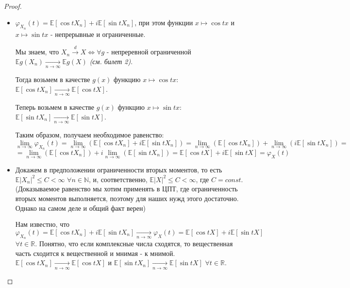 \begin{proof}
    \text{}
    \renewcommand{\labelitemi}{$\boldsymbol{\Rightarrow}$}
    \begin{itemize}
        \item \text{}
        
        $\varphi_{X_n}(t) = \mathbb{E}[\cos{tX_n}] + i\mathbb{E}[\sin{tX_n}]$, при этом функции $x \mapsto \cos{tx}$ и $x \mapsto \sin{tx}$ - непрерывные и ограниченные.
        
        Мы знаем, что $X_n \xrightarrow{d} X \Leftrightarrow \forall g$ - непреревной ограниченной $\mathbb{E}g(X_n) \xrightarrow[n \rightarrow \infty]{} \mathbb{E}g(X)$ \textit{(см. билет 2)}.
        
        Тогда возьмем в качестве $g(x)$ функцию $x \mapsto \cos{tx}$: $\mathbb{E}[\cos{tX_n}] \xrightarrow[n \rightarrow \infty]{} \mathbb{E}[\cos{tX}]$.
        
        Теперь возьмем в качестве $g(x)$ функцию $x \mapsto \sin{tx}$: $\mathbb{E}[\sin{tX_n}] \xrightarrow[n \rightarrow \infty]{} \mathbb{E}[\sin{tX}]$.
        
        Таким образом, получаем необходимое равенство: $$ \lim_{n \to \infty} \varphi_{X_n}(t) = \lim_{n \to \infty} (\mathbb{E}[\cos{tX_n}] + i\mathbb{E}[\sin{tX_n}]) = \lim_{n \to \infty} (\mathbb{E}[\cos{tX_n}]) + \lim_{n \to \infty} (i\mathbb{E}[\sin{tX_n}]) = $$ $$ = \lim_{n \to \infty} (\mathbb{E}[\cos{tX_n}]) + i\lim_{n \to \infty} (\mathbb{E}[\sin{tX_n}]) = \mathbb{E}[\cos{tX}] + i\mathbb{E}[\sin{tX}] = \varphi_{X}(t) $$
    \end{itemize}
    
    \renewcommand{\labelitemi}{$\boldsymbol{\Leftarrow}$}
    \begin{itemize}
        \item \text{}
        
        Докажем в предположении ограниченности вторых моментов, то есть $\mathbb{E}|X_n|^2 \leq C < \infty$ $\forall n \in \mathbb{N}$, и, соответственно, $\mathbb{E}|X|^2 \leq C < \infty$, где $C = const$. (Доказываемое равенство мы хотим применять в ЦПТ, где ограниченность вторых моментов выполняется, поэтому для наших нужд этого достаточно. Однако на самом деле и общий факт верен)
        
        Нам известно, что $\varphi_{X_n}(t) = \mathbb{E}[\cos{tX_n}] + i\mathbb{E}[\sin{tX_n}] \xrightarrow[n \rightarrow \infty]{} \varphi_{X}(t) = \mathbb{E}[\cos{tX}] + i\mathbb{E}[\sin{tX}]$ $\forall t \in \mathbb{R}$. Понятно, что если комплексные числа сходятся, то вещественная часть сходится к вещественной и мнимая - к мнимой. $\mathbb{E}[\cos{tX_n}] \xrightarrow[n \rightarrow \infty]{} \mathbb{E}[\cos{tX}]$ и $ \mathbb{E}[\sin{tX_n}] \xrightarrow[n \rightarrow \infty]{} \mathbb{E}[\sin{tX}]$ $\forall t \in \mathbb{R}$.
        

\end{itemize}
\end{proof}
